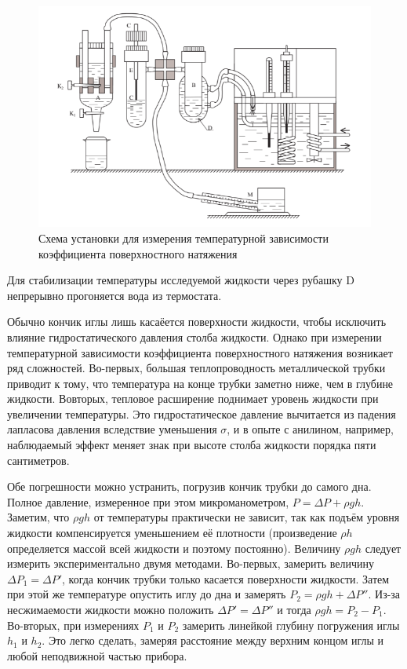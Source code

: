\documentclass[12pt]{article}
\begin{document}
    \begin{figure}[H]
        \centering
        \includegraphics[scale=2]{img/stand.png}
        \caption{
        Схема установки для измерения температурной зависимости
        коэффициента поверхностного натяжения
        }
    \end{figure}
    Для стабилизации температуры исследуемой жидкости через рубашку D непрерывно
    прогоняется вода из термостата.

    Обычно кончик иглы лишь касаёется поверхности жидкости, чтобы исключить
    влияние гидростатического давления столба жидкости. Однако при измерении
    температурной зависимости коэффициента поверхностного натяжения возникает
    ряд сложностей. Во-первых, большая теплопроводность металлической трубки
    приводит к тому, что температура на конце трубки заметно ниже, чем в глубине
    жидкости. Вовторых, тепловое расширение поднимает уровень жидкости при
    увеличении температуры. Это гидростатическое давление вычитается из падения
    лапласова давления вследствие уменьшения $\sigma$, и в опыте с анилином,
    например, наблюдаемый эффект меняет знак при высоте столба жидкости порядка
    пяти сантиметров.

    Обе погрешности можно устранить, погрузив кончик трубки до самого дна.
    Полное давление, измеренное при этом микроманометром, $P=\Delta P+\rho g h$.
    Заметим, что $\rho g h$ от температуры практически не зависит, так как
    подъём уровня жидкости компенсируется уменьшением её плотности (произведение
    $\rho h$ определяется массой всей жидкости и поэтому постоянно). Величину
    $\rho g h$ следует измерить экспериментально двумя методами. Во-первых,
    замерить величину $\Delta P_1 = \Delta P'$, когда кончик трубки только
    касается поверхности жидкости. Затем при этой же температуре опустить иглу
    до дна и замерять $P_2 = \rho gh + \Delta P''$. Из-за несжимаемости
    жидкости можно положить $\Delta P' = \Delta P''$ и тогда $\rho gh = P_2 -
    P_1$. Во-вторых, при измерениях $P_1$ и $P_2$ замерить линейкой глубину
    погружения иглы $h_1$ и $h_2$. Это легко сделать, замеряя расстояние
    между верхним концом иглы и любой неподвижной частью прибора.
\end{document}
